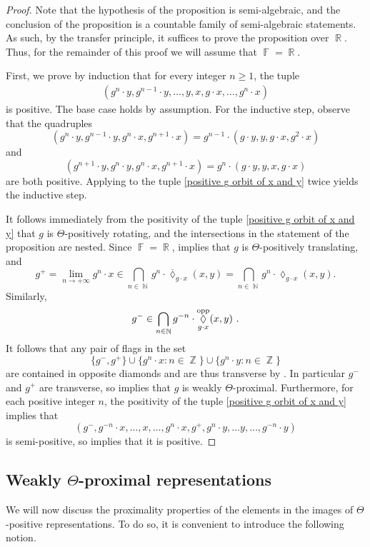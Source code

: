 \documentclass{amsart}
\theoremstyle{plain}
\theoremstyle{definition}
\DeclareMathOperator{\Diam}{\lozenge}
\DeclareMathOperator{\Fb}{{\mathbb{F}}}
\DeclareMathOperator{\Nb}{{\mathbb{N}}}
\DeclareMathOperator{\Rb}{{\mathbb{R}}}
\DeclareMathOperator{\Zb}{\mathbb{Z}}
\newcommand{\opp}{\textnormal{opp}}
\newcommand{\1}{\mathbf{1}}
\begin{document}
\begin{proof}
Note that the hypothesis of the proposition is semi-algebraic, and the conclusion of the proposition is a countable family of semi-algebraic statements. As such, by the transfer principle, it suffices to prove the proposition over $\Rb$. Thus, for the remainder of this proof we will assume that $\Fb=\Rb$.

First, we prove by induction that for every integer $n\ge 1$, the tuple
\begin{align}\label{positive g orbit of x and y}
    (g^n \cdot y, g^{n-1}\cdot y, \ldots, y, x, g\cdot x, \ldots, g^n\cdot x)
\end{align}
is positive. The base case holds by assumption. For the inductive step, observe that the quadruples 
\[(g^n\cdot y, g^{n-1}\cdot y, g^n \cdot x, g^{n+1}\cdot x) = g^{n-1}\cdot (g\cdot y, y, g\cdot x, g^2\cdot x)\]
and
\[(g^{n+1}\cdot y,g^n\cdot y, g^n\cdot x, g^{n+1}\cdot x) = g^n\cdot (g\cdot y,y,x, g\cdot x)\]
are both positive. Applying  to the tuple \eqref{positive g orbit of x and y} twice yields the inductive step.

It follows immediately from the positivity of the tuple \eqref{positive g orbit of x and y} that $g$ is $\Theta$-positively rotating, and the intersections in the statement of the proposition are nested. Since $\Fb=\Rb$,  implies that $g$ is $\Theta$-positively translating, and
\[g^+ =\lim_{n \to +\infty} g^n\cdot x \in \bigcap_{n\in \Nb} g^n \cdot \overline{\Diam}_{g\cdot x}(x,y)=\bigcap_{n\in \Nb} g^n \cdot \Diam_{g\cdot x}(x,y).\]
Similarly, \[g^- \in \bigcap_{n\in \Nb} g^{-n} \cdot \Diam_{g\cdot x}^\opp(x,y)~.\] 
It follows that any pair of flags in the set 
\[\{g^-,g^+\}\cup\{g^n\cdot x:n\in\Zb\}\cup\{g^n\cdot y:n\in\Zb\}\]
are contained in opposite diamonds and are thus transverse by . In particular $g^-$ and $g^+$ are transverse, so  implies that $g$ is weakly $\Theta$-proximal. Furthermore, for each positive integer $n$, the positivity of the tuple \eqref{positive g orbit of x and y} implies that
\[(g^-, g^{-n}\cdot x,\ldots , x, \ldots, g^n\cdot x, g^+ , g^n \cdot y, \ldots y, \ldots , g^{-n}\cdot y)\]
is semi-positive, so  implies that it is positive.
\end{proof}

\subsection{%
\texorpdfstring{%
Weakly $\Theta$-proximal representations}%
{Weakly Theta-proximal representations}}
\label{section : proximal representations}
We will now discuss the proximality properties of the elements in the images of $\Theta$-positive representations. To do so, it is convenient to introduce the following notion.
\end{document}
